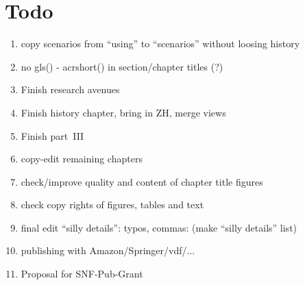 \section*{Todo}

\begin{enumerate}\styleEnumerate

\item copy scenarios from ``using'' to ``scenarios'' without loosing history

\item no gls() - acrshort() in section/chapter titles (?)

\item Finish research avenues

\item Finish history chapter, bring in ZH, merge views

\item Finish part~III

\item copy-edit remaining chapters

\item check/improve quality and content of chapter title figures

\item check copy rights of figures, tables and text

\item final edit ``silly details'': typos, commas: (make ``silly details'' list)

\item publishing with Amazon/Springer/vdf/...

\item Proposal for SNF-Pub-Grant






\end{enumerate}
